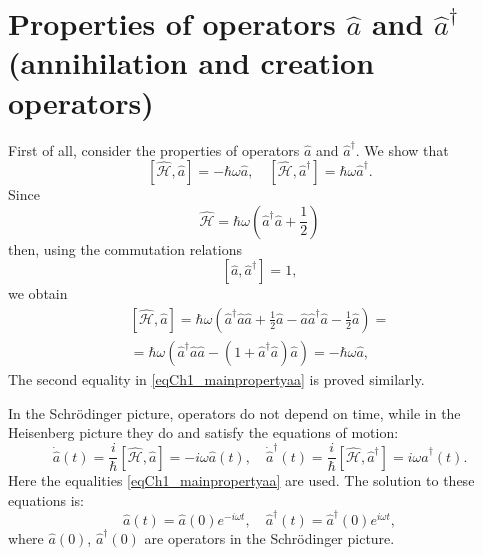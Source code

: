 \section{Properties of operators $ \hat a $ and $ \hat a ^\dag $ (annihilation and creation operators)} 
First of all, consider the properties of operators $\hat{a}$ and
$\hat{a}^{\dag}$. We show that 
\begin{equation}
\left[\hat{\mathcal{H}}, \hat{a}\right] = 
- \hbar \omega \hat{a}, \quad
\left[\hat{\mathcal{H}}, \hat{a}^{\dag}\right] = 
\hbar \omega \hat{a}^{\dag}.
\label{eqCh1_mainpropertyaa}
\end{equation}
Since  
\[
\hat{\mathcal{H}} =  
\hbar \omega \left(\hat{a}^{\dag} \hat{a} +
\frac{1}{2}\right)
\]
then, using the commutation relations
\[
\left[\hat{a}, \hat{a}^{\dag}\right] = 1,
\]  
we obtain
\begin{eqnarray}
\left[\hat{\mathcal{H}}, \hat{a}\right] = 
\hbar \omega \left( 
\hat{a}^{\dag}\hat{a}\hat{a} + \frac{1}{2} \hat{a} -
\hat{a}\hat{a}^{\dag}\hat{a} - \frac{1}{2}\hat{a} 
\right)
= 
\nonumber \\ 
= \hbar \omega\left(
\hat{a}^{\dag}\hat{a}\hat{a} - \left(1 + \hat{a}^{\dag}\hat{a}\right)\hat{a} 
\right) = - \hbar \omega \hat{a} 
,
\nonumber
\end{eqnarray}
The second equality in \eqref{eqCh1_mainpropertyaa} is proved
similarly. 

In the Schrödinger picture, operators do not depend on time, while in
the Heisenberg picture they do and satisfy the equations of motion: 
\begin{equation}
\dot{\hat{a}}\left(t\right) = \frac{i}{\hbar}\left[\hat{\mathcal{H}},
  \hat{a}\right] = -i \omega \hat{a}\left(t\right), \quad
\dot{\hat{a}}^{\dag}\left(t\right) = \frac{i}{\hbar}\left[\hat{\mathcal{H}},
  \hat{a}^{\dag}\right] = i \omega \hat{a}^{\dag}\left(t\right).
\label{eqCh1_54}
\end{equation}
Here the equalities \eqref{eqCh1_mainpropertyaa} are used. The solution
to these equations is: 
\begin{equation}
\hat{a}\left(t\right) = \hat{a}\left(0\right) e^{- i \omega t}, \quad
\hat{a}^{\dag}\left(t\right) = \hat{a}^{\dag}\left(0\right) e^{i \omega t}, 
\end{equation}
where $\hat{a}\left(0\right)$, $\hat{a}^{\dag}\left(0\right)$ are operators
in the Schrödinger picture.
